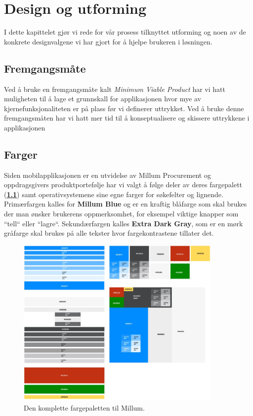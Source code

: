 \chapter{\color{Millum}\textbf{Design og utforming}}
I dette kapittelet gjør vi rede for vår prosess tilknyttet utforming og noen av de konkrete designvalgene vi har gjort for å hjelpe brukeren i løsningen.

\section{\textbf{Fremgangsmåte}}
Ved å bruke en fremgangsmåte kalt \textit{Minimum Viable Product} har vi hatt muligheten til å lage et grunnskall for applikasjonen hvor mye av kjernefunksjonaliteten er på plass før vi definerer uttrykket. Ved å bruke denne fremgangsmåten har vi hatt mer tid til å konseptualisere og skissere uttrykkene i applikasjonen

\section{\textbf{Farger}}
Siden mobilapplikasjonen er en utvidelse av Millum Procurement og oppdragsgivers produktportefølje har vi valgt å følge deler av deres fargepalett (\textbf{\ref{fig:farger}}) samt operativsystemene sine egne farger for søkefelter og lignende. Primærfargen kalles for \textbf{Millum Blue} og er en kraftig blåfarge som skal brukes der man ønsker brukerens oppmerksomhet, for eksempel viktige knapper som ``tell`` eller ``lagre``. Sekundærfargen kalles \textbf{Extra Dark Gray}, som er en mørk gråfarge skal brukes på alle tekster hvor fargekontrastene tillater det. 

\begin{figure}[H] 
    \centering
    \includegraphics[width=100mm]{figures/Design-utforming/Fargepalett.JPG}
    \caption{Den komplette fargepaletten til Millum.}
    \label{fig:farger}
\end{figure}

